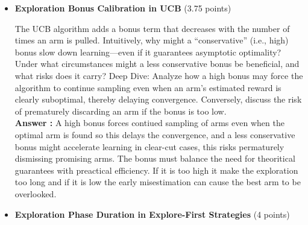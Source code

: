 \documentclass[12pt]{article}
\begin{document}
{{{\begin{itemize}[noitemsep]
    \vspace{0.25cm}
    In non‑stationary environments where reward probabilities drift or change abruptly, standard bandit algorithms struggle because they assume stationarity. Intuitively, explain how and why a “forgetting” or discounting mechanism might improve performance. What challenges arise in choosing the right decay rate, and how might it interact with the exploration bonus?
    Deep Dive:
    Describe the delicate balance between retaining useful historical information and quickly adapting to new trends, and the potential for “chasing noise” if the decay is too aggressive.\\
    \textbf{Answer :} A forgetting mechanism lets agent discount old data to quickly to adapt to changing rewards, but choosing the decay rate is challenging because if it is too fast loses valuable info and if it is too slow hampers adaptation.
    The decay must balance retaining useful history and reacting to new trends, an aggressive decay can make the agent chase noisr and a conservative decay may not reflect changes and this misguides the exploration bonus.
    \vspace{0.5cm}
    \item \textbf{Exploration Bonus Calibration in UCB} (3.75 points)

    \vspace{0.25cm}
    The UCB algorithm adds a bonus term that decreases with the number of times an arm is pulled. Intuitively, why might a “conservative” (i.e., high) bonus slow down learning—even if it guarantees asymptotic optimality? Under what circumstances might a less conservative bonus be beneficial, and what risks does it carry?
    Deep Dive:
    Analyze how a high bonus may force the algorithm to continue sampling even when an arm’s estimated reward is clearly suboptimal, thereby delaying convergence. Conversely, discuss the risk of prematurely discarding an arm if the bonus is too low.\\
    \textbf{Answer :} A high bonus forces contiued sampling of arms even when the optimal arm is found so this delays the convergence, and a less conservative bonus might accelerate learning in clear-cut cases, this risks permaturely dismissing promising arms.
    The bonus must balance the need for theoritical guarantees with preactical efficiency. If it is too high it make the exploration too long and if it is low the early misestimation can cause the best arm to be overlooked.
    \vspace{0.5cm}
    \item \textbf{Exploration Phase Duration in Explore-First Strategies} (4 points)
    

\end{itemize}}}}
\end{document}
